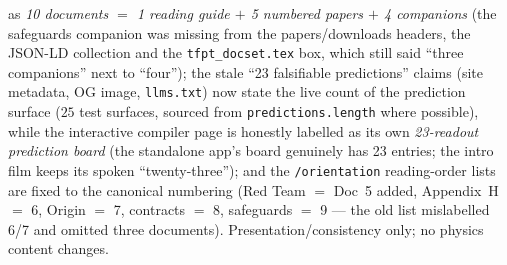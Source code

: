 \begin{itemize}[leftmargin=1.5em]
as \emph{10 documents $=$ 1 reading guide $+$ 5 numbered papers $+$ 4 companions} (the
safeguards companion was missing from the papers/downloads headers, the JSON-LD collection
and the \texttt{tfpt\_docset.tex} box, which still said ``three companions'' next to
``four''); the stale ``23 falsifiable predictions'' claims (site metadata, OG image,
\texttt{llms.txt}) now state the live count of the prediction surface ($25$ test surfaces,
sourced from \texttt{predictions.length} where possible), while the interactive compiler
page is honestly labelled as its own \emph{23-readout prediction board} (the standalone
app's board genuinely has 23 entries; the intro film keeps its spoken ``twenty-three'');
and the \texttt{/orientation} reading-order lists are fixed to the canonical numbering
(Red Team $=$ Doc~5 added, Appendix~H $=$ 6, Origin $=$ 7, contracts $=$ 8, safeguards $=$ 9
--- the old list mislabelled 6/7 and omitted three documents). Presentation/consistency
only; no physics content changes.
\end{itemize}

